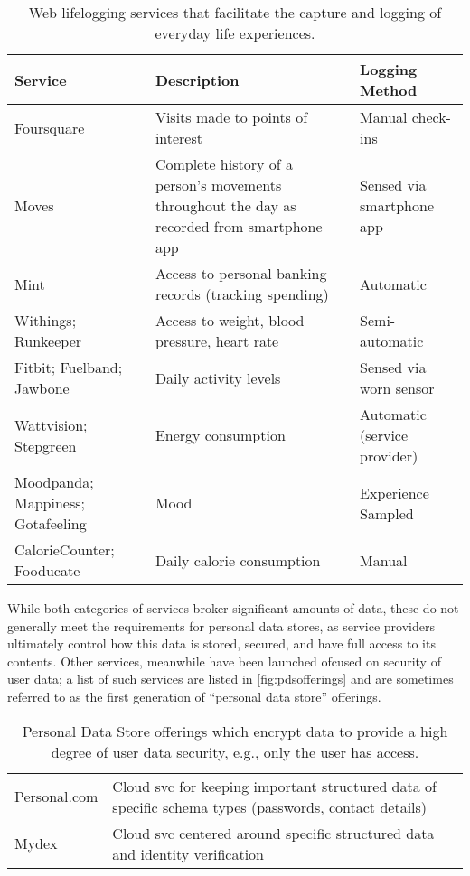 \documentclass[runningheads,a4paper]{llncs}
\begin{document}
\begin{table}
\begin{tabular}{p{2cm} p{6.1cm} p{2.54cm}}
Service & Description & Logging Method \\
\hline
Foursquare & Visits made to points of interest & Manual check-ins \\
\hline
Moves & Complete history of a person's movements throughout the day as recorded from smartphone app  & Sensed via smartphone app \\ 
\hline
Mint & Access to personal banking records (tracking spending) & Automatic \\
\hline
Withings; Runkeeper & Access to weight, blood pressure, heart rate & Semi-automatic\\
\hline
Fitbit; Fuelband; Jawbone & Daily activity levels & Sensed via worn sensor \\ 
\hline
Wattvision; Stepgreen & Energy consumption & Automatic (service provider) \\
\hline
Moodpanda; Mappiness; Gotafeeling & Mood & Experience Sampled \\
\hline
CalorieCounter; Fooducate & Daily calorie consumption & Manual \\
\end{tabular}
\caption{Web lifelogging services that facilitate the capture and logging of everyday life experiences. }
\label{fig:aboutme}
\end{table}

While both categories of services broker significant amounts of data, these do not generally meet the requirements for personal data stores, as service providers ultimately control how this data is stored, secured, and have full access to its contents.  Other services, meanwhile have been launched ofcused on security of user data; a list of such services are listed in \ref{fig:pdsofferings} and are sometimes referred to as the first generation of ``personal data store'' offerings.

\begin{table}
\begin{tabular}{l p{8.5cm}}
Personal.com & Cloud svc for keeping important structured data of specific schema types (passwords, contact details)  \\
Mydex & Cloud svc centered around specific structured data and identity verification  \\
\end{tabular}
\caption{Personal Data Store offerings which encrypt data to provide a high degree of user data security, e.g., only the user has access.}
\label{fig:pdsofferingsp}
\end{table}
\end{document}
